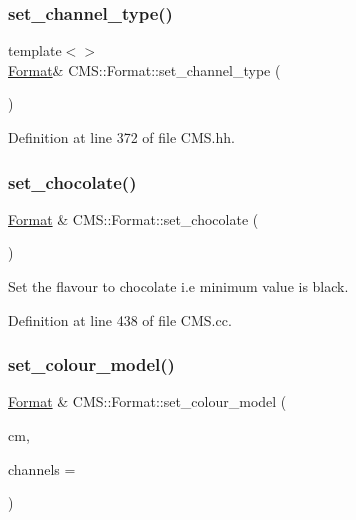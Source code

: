 \subsubsection{\texorpdfstring{set\+\_\+channel\+\_\+type()}{set\_channel\_type()}\hspace{0.1cm}{\footnotesize\ttfamily [8/8]}}
{\footnotesize\ttfamily template$<$$>$ \\
\hyperlink{class_c_m_s_1_1_format}{Format}\& C\+M\+S\+::\+Format\+::set\+\_\+channel\+\_\+type (\begin{DoxyParamCaption}\item[{void}]{ }\end{DoxyParamCaption})\hspace{0.3cm}{\ttfamily [inline]}}



Definition at line 372 of file C\+M\+S.\+hh.

\mbox{\label{class_c_m_s_1_1_format_aae8f3fe22d8a9c70c4f5e69137b7331f}} 
\subsubsection{\texorpdfstring{set\+\_\+chocolate()}{set\_chocolate()}}
{\footnotesize\ttfamily \hyperlink{class_c_m_s_1_1_format}{Format} \& C\+M\+S\+::\+Format\+::set\+\_\+chocolate (\begin{DoxyParamCaption}\item[{void}]{ }\end{DoxyParamCaption})}



Set the flavour to \textquotesingle{}chocolate\textquotesingle{} i.\+e minimum value is black. 



Definition at line 438 of file C\+M\+S.\+cc.

\mbox{\label{class_c_m_s_1_1_format_a741f035f99ca8787ab47a1d4446de083}} 
\subsubsection{\texorpdfstring{set\+\_\+colour\+\_\+model()}{set\_colour\_model()}}
{\footnotesize\ttfamily \hyperlink{class_c_m_s_1_1_format}{Format} \& C\+M\+S\+::\+Format\+::set\+\_\+colour\+\_\+model (\begin{DoxyParamCaption}\item[{const \hyperlink{namespace_c_m_s_a9cb18b5da51a22c3c9dd25a5c9048e42}{Colour\+Model}}]{cm,  }\item[{unsigned int}]{channels = {} }\end{DoxyParamCaption})}

